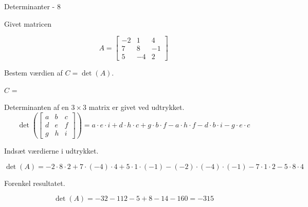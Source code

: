 \documentclass{article}
\begin{document}
\begin{exercise}{Determinanter - 8}
	
	Givet matricen
	
	\[
	A = \left[\begin{array}{rrr}
	-2 & 1 & 4 \\ 
	7 & 8 & -1 \\
	5 & -4 & 2
	\end{array} \right]
	\]
	
	Bestem værdien af $C = \det(A)$.
	
	$C$ = 
	
	\hint
	Determinanten af en $3 \times 3$ matrix er givet ved udtrykket.
	\[
	\det \left( \left[\begin{array}{rrr}
	a & b & c \\ 
	d & e & f \\
	g & h & i
	\end{array} \right] \right) = a \cdot e \cdot i + d \cdot h \cdot c + g \cdot b \cdot f - a \cdot h \cdot f - d \cdot b \cdot i - g \cdot e \cdot c
	\]
	
	\hint
	Indsæt værdierne i udtrykket.
	
	\hint
	\[
	\det \left( A \right) = -2 \cdot 8 \cdot 2 + 7 \cdot (-4) \cdot 4 + 5 \cdot 1 \cdot (-1) - (-2) \cdot (-4) \cdot (-1) - 7 \cdot 1 \cdot 2 - 5 \cdot 8 \cdot 4
	\]
	
	\hint
	Forenkel resultatet.
	
	\hint
	\[
	\det \left( A \right) = -32 - 112 - 5 + 8 - 14 - 160 = -315
	\]
	
\end{exercise}
\end{document}
